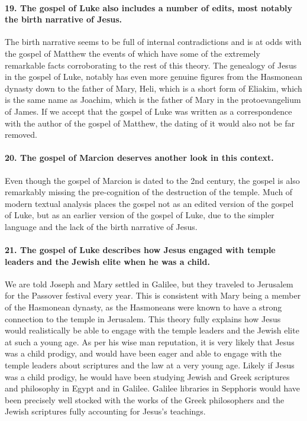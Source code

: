 \paragraph{19.
The gospel of Luke also includes a number of edits, most notably the birth narrative of Jesus.}\label{par:the-gospel-of-luke-also-includes-a-number-of-edits-most-notably-the-birth-narrative-of-jesus.}

The birth narrative seems to be full of internal contradictions and is at odds with the gospel of Matthew the events of which have some of the extremely remarkable facts corroborating to the rest of this theory.
The genealogy of Jesus in the gospel of Luke, notably has even more genuine figures from the Hasmonean dynasty down to the father of Mary, Heli, which is a short form of Eliakim, which is the same name as Joachim, which is the father of Mary in the protoevangelium of James.
If we accept that the gospel of Luke was written as a correspondence with the author of the gospel of Matthew, the dating of it would also not be far removed.

\paragraph{20.
The gospel of Marcion deserves another look in this context.}\label{par:the-gospel-of-marcion-deserves-another-look-in-this-context.}

Even though the gospel of Marcion is dated to the 2nd century, the gospel is also remarkably missing the pre-cognition of the destruction of the temple.
Much of modern textual analysis places the gospel not as an edited version of the gospel of Luke, but as an earlier version of the gospel of Luke, due to the simpler language and the lack of the birth narrative of Jesus.

\paragraph{21.
The gospel of Luke describes how Jesus engaged with temple leaders and the Jewish elite when he was a child.}\label{par:the-gospel-of-luke-describes-how-jesus-engaged-with-temple-leaders-and-the-jewish-elite-when-he-was-a-child.}

We are told Joseph and Mary settled in Galilee, but they traveled to Jerusalem for the Passover festival every year.
This is consistent with Mary being a member of the Hasmonean dynasty, as the Hasmoneans were known to have a strong connection to the temple in Jerusalem.
This theory fully explains how Jesus would realistically be able to engage with the temple leaders and the Jewish elite at such a young age.
As per his wise man reputation, it is very likely that Jesus was a child prodigy, and would have been eager and able to engage with the temple leaders about scriptures and the law at a very young age.
Likely if Jesus was a child prodigy, he would have been studying Jewish and Greek scriptures and philosophy in Egypt and in Galilee.
Galilee libraries in Sepphoris would have been precisely well stocked with the works of the Greek philosophers and the Jewish scriptures fully accounting for Jesus's teachings.

